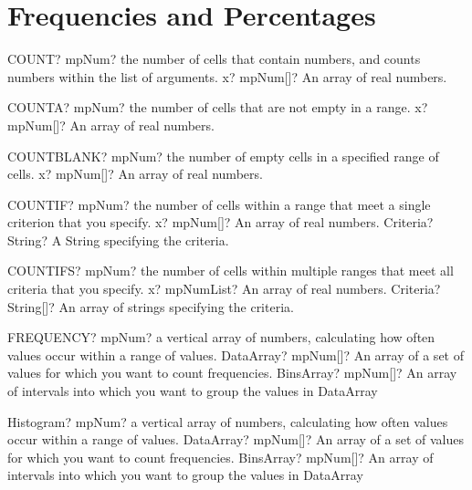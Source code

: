 \documentclass[12pt,a4paper,openany]{book}
\begin{document}
\section{Frequencies and Percentages}

\begin{mpFunctionsExtract}
\mpWorksheetFunctionOneNotImplemented
{COUNT? mpNum? the number of cells that contain numbers, and counts numbers within the list of arguments.}
{x? mpNum[]? An array of real numbers.}
\end{mpFunctionsExtract}

\begin{mpFunctionsExtract}
\mpWorksheetFunctionOneNotImplemented
{COUNTA? mpNum? the number of cells that are not empty in a range.}
{x? mpNum[]? An array of real numbers.}
\end{mpFunctionsExtract}

\begin{mpFunctionsExtract}
\mpWorksheetFunctionOneNotImplemented
{COUNTBLANK? mpNum? the number of empty cells in a specified range of cells.}
{x? mpNum[]? An array of real numbers.}
\end{mpFunctionsExtract}

\begin{mpFunctionsExtract}
\mpWorksheetFunctionTwoNotImplemented
{COUNTIF? mpNum? the number of cells within a range that meet a single criterion that you specify.}
{x? mpNum[]? An array of real numbers.}
{Criteria? String? A String specifying the criteria.}
\end{mpFunctionsExtract}

\begin{mpFunctionsExtract}
\mpWorksheetFunctionTwoNotImplemented
{COUNTIFS? mpNum? the number of cells within multiple ranges that meet all criteria that you specify.}
{x? mpNumList? An array of real numbers.}
{Criteria? String[]? An array of strings specifying the criteria.}
\end{mpFunctionsExtract}

\begin{mpFunctionsExtract}
\mpWorksheetFunctionTwoNotImplemented
{FREQUENCY? mpNum? a vertical array of numbers, calculating how often values occur within a range of values.}
{DataArray? mpNum[]? An array of a set of values for which you want to count frequencies.}
{BinsArray? mpNum[]? An array of intervals into which you want to group the values in \textsf{DataArray}}
\end{mpFunctionsExtract}

\begin{mpFunctionsExtract}
\mpWorksheetFunctionTwoNotImplemented
{Histogram? mpNum? a vertical array of numbers, calculating how often values occur within a range of values.}
{DataArray? mpNum[]? An array of a set of values for which you want to count frequencies.}
{BinsArray? mpNum[]? An array of intervals into which you want to group the values in \textsf{DataArray}}
\end{mpFunctionsExtract}
\end{document}
